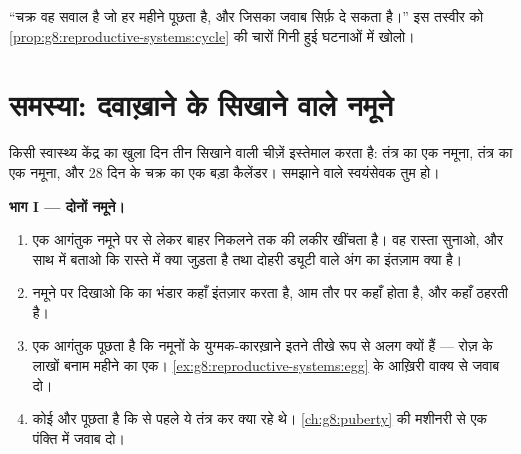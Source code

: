\begin{exercise}[$\star\star\star$]\label{exo:g8:reproductive-systems:12}
``चक्र वह सवाल है जो  हर महीने पूछता है, और जिसका जवाब सिर्फ़
 दे सकता है।'' इस तस्वीर को
\cref{prop:g8:reproductive-systems:cycle} की चारों गिनी हुई घटनाओं में
खोलो।
\end{exercise}

\section{समस्या: दवाख़ाने के सिखाने वाले नमूने}

\begin{problem}\label{pb:g8:reproductive-systems:1}
किसी स्वास्थ्य केंद्र का खुला दिन तीन सिखाने वाली चीज़ें इस्तेमाल करता
है:  तंत्र का एक नमूना,  तंत्र का एक नमूना, और 28 दिन के चक्र का
एक बड़ा कैलेंडर। समझाने वाले स्वयंसेवक तुम हो।

\medskip\noindent\textbf{भाग I --- दोनों नमूने।}
\begin{enumerate}
  \item एक आगंतुक  नमूने पर  से लेकर बाहर निकलने तक की लकीर
        खींचता है। वह रास्ता सुनाओ, और साथ में बताओ कि रास्ते में क्या
        जुड़ता है तथा दोहरी ड्यूटी वाले अंग का इंतज़ाम क्या है।
  \item {} नमूने पर दिखाओ कि  का भंडार कहाँ इंतज़ार करता है,
         आम तौर पर कहाँ होता है, और  कहाँ ठहरती है।
  \item एक आगंतुक पूछता है कि नमूनों के युग्मक-कारख़ाने इतने तीखे रूप
        से अलग क्यों हैं --- रोज़ के लाखों बनाम महीने का एक।
        \cref{ex:g8:reproductive-systems:egg} के आख़िरी वाक्य से जवाब
        दो।
  \item कोई और पूछता है कि  से पहले ये तंत्र कर क्या रहे थे।
        \cref{ch:g8:puberty} की मशीनरी से एक पंक्ति में जवाब दो।
\end{enumerate}


\end{problem}
